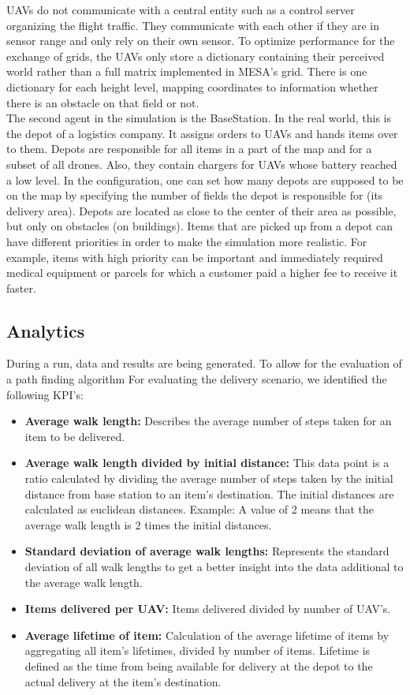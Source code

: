 UAVs do not communicate with a central entity such as a control server organizing the flight traffic. They communicate with each other if they are in sensor range and only rely on their own sensor.
To optimize performance for the exchange of grids, the UAVs only store a dictionary containing their perceived world rather than a full matrix implemented in MESA's grid.
There is one dictionary for each height level, mapping coordinates to information whether there is an obstacle on that field or not.  
\\
The second agent in the simulation is the BaseStation. In the real world, this is the depot of a logistics company. It assigns orders to UAVs and hands items over to them. Depots are responsible for all items in a part of the map and for a subset of all drones. Also, they contain chargers for UAVs whose battery reached a low level. In the configuration, one can set how many depots are supposed to be on the map by specifying the number of fields the depot is responsible for (its delivery area). Depots are located as close to the center of their area as possible, but only on obstacles (on buildings). Items that are picked up from a depot can have different priorities in order to make the simulation more realistic. For example, items with high priority can be important and immediately required medical equipment or parcels for which a customer paid a higher fee to receive it faster.



\subsection{Analytics}\label{sec:KPI}
During a run, data and results are being generated. To allow for the evaluation of a path finding algorithm
For evaluating the delivery scenario, we identified the following KPI's:
\begin{itemize}
	\item \textbf{Average walk length:} Describes the average number of steps taken for an item to be delivered. 
	\item \textbf{Average walk length divided by initial distance:} This data point is a ratio calculated by dividing the average number of steps taken by the initial distance from base station to an item's destination. The initial distances are calculated as euclidean distances. Example: A value of 2 means that the average walk length is 2 times the initial distances.
	\item \textbf{Standard deviation of average walk lengths:} Represents the standard deviation of all walk lengths to get a better insight into the data additional to the average walk length.
	\item \textbf{Items delivered per UAV:} Items delivered divided by number of UAV's.
	\item \textbf{Average lifetime of item:} Calculation of the average lifetime of items by aggregating all item's lifetimes, divided by number of items. Lifetime is defined as the time from being available for delivery at the depot to the actual delivery at the item's destination.
\end{itemize}

